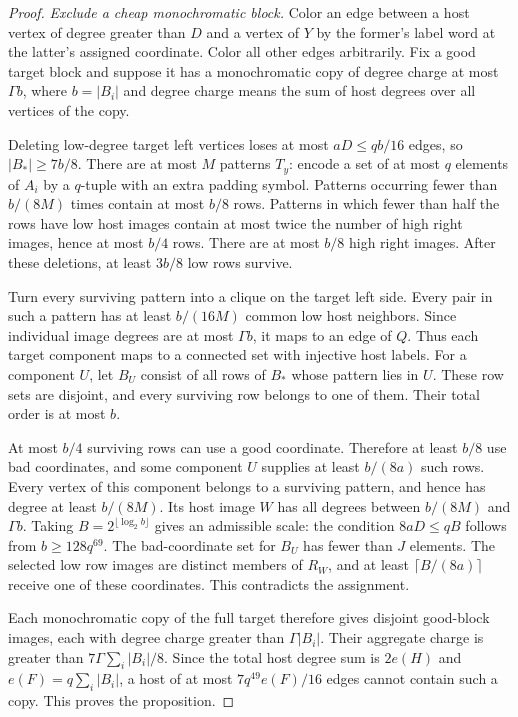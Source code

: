 \documentclass[11pt]{amsart}
\theoremstyle{definition}
\theoremstyle{remark}
\numberwithin{equation}{section}
\begin{document}
\begin{proof}
\medskip\noindent\emph{Exclude a cheap monochromatic block.}
Color an edge between a host vertex of degree greater than $D$ and a
vertex of $Y$ by the former's label word at the latter's assigned
coordinate. Color all other edges arbitrarily. Fix a good target block
and suppose it has a monochromatic copy of degree charge at most
$\Gamma b $, where $ b=|B_i|$ and degree charge means the sum of host
degrees over all vertices of the copy.

Deleting low-degree target left vertices loses at most $aD\le qb/16$
edges, so $|B_*|\ge7b/8$. There are at most $ M $ patterns $ T_y$:
encode a set of at most $q $ elements of $ A_i $ by a $ q$-tuple with an
extra padding symbol. Patterns occurring fewer than $b/(8M)$ times
contain at most $b/8$ rows. Patterns in which fewer than half the rows
have low host images contain at most twice the number of high right
images, hence at most $b/4$ rows. There are at most $ b/8$ high right
images. After these deletions, at least $3b/8$ low rows survive.

Turn every surviving pattern into a clique on the target left side.
Every pair in such a pattern has at least $b/(16M)$ common low host
neighbors. Since individual image degrees are at most $\Gamma b$, it
maps to an edge of $Q$. Thus each target component maps to a connected
set with injective host labels. For a component $U $, let $ B_U$ consist
of all rows of $B_*$ whose pattern lies in $ U$. These row sets are
disjoint, and every surviving row belongs to one of them. Their total
order is at most $b$.

At most $b/4$ surviving rows can use a good coordinate. Therefore at
least $b/8$ use bad coordinates, and some component $ U$ supplies at
least $b/(8a)$ such rows. Every vertex of this component belongs to a
surviving pattern, and hence has degree at least $b/(8M)$. Its host
image $W $ has all degrees between $ b/(8M)$ and $\Gamma b$.
Taking $B=2^{\lfloor\log_2b\rfloor}$ gives an admissible scale: the
condition $8aD\le qB $ follows from $ b\ge128q^{69}$.
The bad-coordinate set for $B_U $ has fewer than $ J$ elements. The
selected low row images are distinct members of $R_W$, and at least
$\lceil B/(8a)\rceil$ receive one of these coordinates. This contradicts
the assignment.

Each monochromatic copy of the full target therefore gives disjoint
good-block images, each with degree charge greater than $\Gamma|B_i|$.
Their aggregate charge is greater than $7\Gamma\sum_i|B_i|/8$.
Since the total host degree sum is $2e(H)$ and
$e(F)=q\sum_i|B_i|$, a host of at most $7q^{49}e(F)/16$ edges cannot
contain such a copy. This proves the proposition.
\end{proof}
\end{document}
